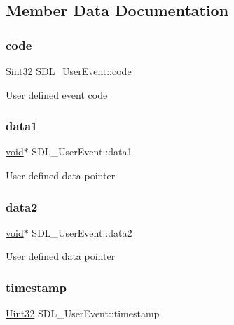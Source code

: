 \subsection{Member Data Documentation}
\mbox{\label{struct_s_d_l___user_event_aef47976781ee82b527a353c5acfa0a34}} 
\subsubsection{\texorpdfstring{code}{code}}
{\footnotesize\ttfamily \mbox{\hyperlink{_s_d_l__stdinc_8h_a7a90b941db9d4582e9ad7abb9940ff7e}{Sint32}} S\+D\+L\+\_\+\+User\+Event\+::code}

User defined event code \mbox{\label{struct_s_d_l___user_event_ab2893a12be2f97195f16463a23107913}} 
\subsubsection{\texorpdfstring{data1}{data1}}
{\footnotesize\ttfamily \mbox{\hyperlink{_s_d_l__opengles2__gl2ext_8h_ae5d8fa23ad07c48bb609509eae494c95}{void}}$\ast$ S\+D\+L\+\_\+\+User\+Event\+::data1}

User defined data pointer \mbox{\label{struct_s_d_l___user_event_aae4dbf65c34d654c9edf519eb061b7cf}} 
\subsubsection{\texorpdfstring{data2}{data2}}
{\footnotesize\ttfamily \mbox{\hyperlink{_s_d_l__opengles2__gl2ext_8h_ae5d8fa23ad07c48bb609509eae494c95}{void}}$\ast$ S\+D\+L\+\_\+\+User\+Event\+::data2}

User defined data pointer \mbox{\label{struct_s_d_l___user_event_adbf1d34c73138a0c549310e5d4ad0c35}} 
\subsubsection{\texorpdfstring{timestamp}{timestamp}}
{\footnotesize\ttfamily \mbox{\hyperlink{_s_d_l__stdinc_8h_add440eff171ea5f55cb00c4a9ab8672d}{Uint32}} S\+D\+L\+\_\+\+User\+Event\+::timestamp}

